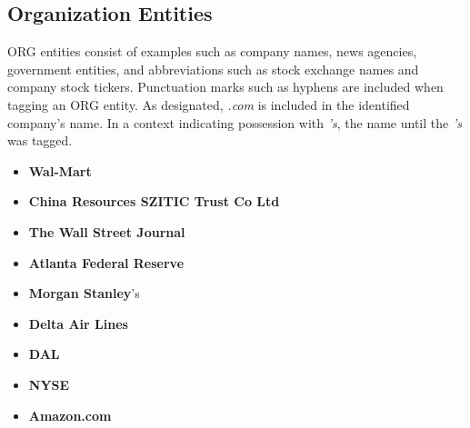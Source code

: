\documentclass[11pt]{article}
\begin{document}
\subsection{Organization Entities}
ORG entities consist of examples such as company names, news agencies, government entities, and abbreviations such as stock exchange names and company stock tickers. Punctuation marks such as hyphens are included when tagging an ORG entity. As designated, \textit{.com} is included in the identified company's name. In a context indicating possession with \textit{'s}, the name until the \textit{'s} was tagged.
\begin{itemize}
    \item \textbf{Wal-Mart}
    \item \textbf{China Resources SZITIC Trust Co Ltd}
    \item \textbf{The Wall Street Journal}
    \item \textbf{Atlanta Federal Reserve} 
    \item \textbf{Morgan Stanley}'s
    \item \textbf{Delta Air Lines}
    \item \textbf{DAL}
    \item \textbf{NYSE}
    \item \textbf{Amazon.com}
\end{itemize}
\end{document}
